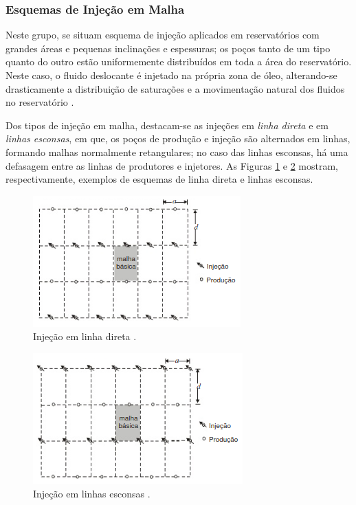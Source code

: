 \subsubsection{Esquemas de Inje\c{c}\~{a}o em Malha}
Neste grupo, se situam esquema de inje\c{c}\~{a}o aplicados em reservat\'{o}rios com grandes \'{a}reas e pequenas inclina\c{c}\~{o}es e espessuras; os po\c{c}os tanto de um tipo quanto do outro est\~{a}o uniformemente distribu\'{i}dos em toda a \'{a}rea do reservat\'{o}rio. Neste caso, o fluido deslocante \'{e} injetado na pr\'{o}pria zona de \'{o}leo, alterando-se drasticamente a distribui\c{c}\~{a}o de satura\c{c}\~{o}es e a movimenta\c{c}\~{a}o natural dos fluidos no reservat\'{o}rio \cite[p. 567]{engres}.

Dos tipos de inje\c{c}\~{a}o em malha, destacam-se as inje\c{c}\~{o}es em \textit{linha direta} e em \textit{linhas esconsas}, em que, os po\c{c}os de produ\c{c}\~{a}o e inje\c{c}\~{a}o s\~{a}o alternados em linhas, formando malhas normalmente retangulares; no caso das linhas esconsas, h\'{a} uma defasagem entre as linhas de produtores e injetores. As Figuras \ref{fig:rev_injld} e \ref{fig:rev_injle} mostram, respectivamente, exemplos de esquemas de linha direta e linhas esconsas.

\begin{figure}[!ht]
\centering
\includegraphics[width=.6\textwidth]{figs/revisao/revisao_injld.png}
\caption{Inje\c{c}\~{a}o em linha direta \cite[p. 567]{engres}.}
\label{fig:rev_injld}
\end{figure}

\begin{figure}[!ht]
\centering
\includegraphics[width=.6\textwidth]{figs/revisao/revisao_injle.png}
\caption{Inje\c{c}\~{a}o em linhas esconsas \cite[p. 567]{engres}.}
\label{fig:rev_injle}
\end{figure}

